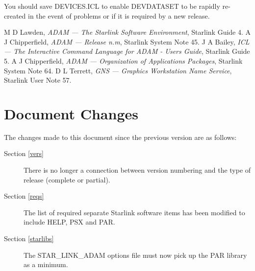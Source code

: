 You should save DEVICES.ICL to enable DEVDATASET to be rapidly re-created 
in the event of problems or if it is required by a new release.

\begin{thebibliography}{9}
 M D Lawden, {\it ADAM --- The Starlink Software Environment},
Starlink Guide 4.
 A J Chipperfield, {\it ADAM --- Release n.m}, Starlink System
Note 45.
 J A Bailey, {\it ICL --- The Interactive Command Language for
ADAM - Users Guide}, Starlink Guide 5.
 A J Chipperfield, {\it ADAM --- Organization of Applications
Packages}, Starlink System Note 64.
 D L Terrett, {\it GNS --- Graphics Workstation Name Service},
Starlink User Note 57.
\end{thebibliography}

\newpage
\appendix
\section{Document Changes}
\label{changes}
The changes made to this document since the previous version are as follows:
\begin{description}
\item[Section \ref{vers}] There is no longer a connection between version 
numbering and the type of release (complete or partial).
\item[Section \ref{reqs}] The list of required separate Starlink software items
has been modified to include HELP, PSX and PAR.
\item[Section \ref{starlibs}] The STAR\_LINK\_ADAM options file must now pick 
up the PAR library as a minimum.
\end{description}

